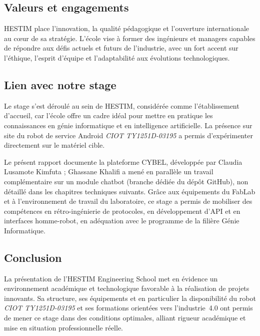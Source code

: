 \subsection{Valeurs et engagements}

HESTIM place l'innovation, la qualité pédagogique et l'ouverture
internationale au cœur de sa stratégie. L'école vise à former des
ingénieurs et managers capables de répondre aux défis actuels et futurs de
l'industrie, avec un fort accent sur l'éthique, l'esprit d'équipe et
l'adaptabilité aux évolutions technologiques.

\subsection{Lien avec notre stage}

Le stage s'est déroulé au sein de HESTIM, considérée comme l'établissement
d'accueil, car l'école offre un cadre idéal pour mettre en pratique les
connaissances en génie informatique et en intelligence artificielle. La
présence sur site du robot de service Android \textit{CIOT TY1251D-03195} a
permis d'expérimenter directement sur le matériel cible.

Le présent rapport documente la plateforme CYBEL, développée par
Claudia Lusamote Kimfuta ; Ghassane Khalifi a mené en parallèle un travail
complémentaire sur un module chatbot (branche dédiée du dépôt GitHub), non
détaillé dans les chapitres techniques suivants. Grâce aux équipements du
FabLab et à l'environnement de travail du laboratoire, ce stage a permis de
mobiliser des compétences en rétro-ingénierie de protocoles, en
développement d'API et en interfaces homme-robot, en adéquation avec le
programme de la filière Génie Informatique.

\subsection{Conclusion}

La présentation de l'HESTIM Engineering School met en évidence un
environnement académique et technologique favorable à la réalisation de
projets innovants. Sa structure, ses équipements et en particulier la
disponibilité du robot \textit{CIOT TY1251D-03195} et ses formations orientées vers
l'industrie~4.0 ont permis de mener ce stage dans des
conditions optimales, alliant rigueur académique et mise en situation
professionnelle réelle.
